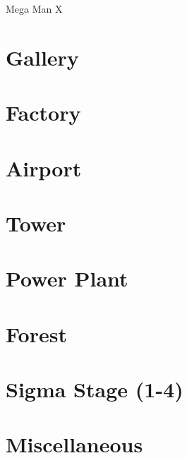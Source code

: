 \documentclass[openany]{report}
\begin{document}
\begin{chapter}{Mega Man X}
	\section{Gallery}
	\section{Factory}
	\section{Airport}
	\section{Tower}
	\section{Power Plant}
	\section{Forest}
	\section{Sigma Stage (1-4)}
	\section{Miscellaneous}\label{X1:misc}
\end{chapter}


\end{document}
